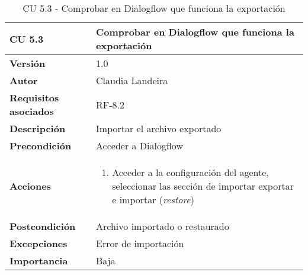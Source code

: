 \begin{table}[p]
	\centering
	\begin{tabularx}{\linewidth}{ p{} p{} }
		\toprule
		\textbf{CU 5.3}    & \textbf{Comprobar en Dialogflow que funciona la exportación}\\
		\toprule
		\textbf{Versión}              & 1.0    \\
		\textbf{Autor}                & Claudia Landeira \\
		\textbf{Requisitos asociados} & RF-8.2\\
		\textbf{Descripción}          & Importar el archivo exportado\\
		\textbf{Precondición}         & Acceder a Dialogflow\\
		\textbf{Acciones}             &
		\begin{enumerate}
			\def\labelenumi{\arabic{enumi}.}
			\tightlist
                \item Acceder a la configuración del agente, seleccionar las sección de importar exportar e importar (\textit{restore})
		\end{enumerate}\\
		\textbf{Postcondición}        & Archivo importado o restaurado  \\
		\textbf{Excepciones}          & Error de importación \\
		\textbf{Importancia}          & Baja \\
		\bottomrule
	\end{tabularx}
	\caption{CU 5.3 - Comprobar en Dialogflow que funciona la exportación}
\end{table}


